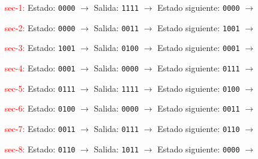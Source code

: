 \documentclass[12pt, letterpaper]{article}
\begin{document}
\begin{enumerate}
    \item[\textcolor{red}{sec-1:}] Estado: \texttt{0000} \(\rightarrow\) Salida: \texttt{1111} \(\rightarrow\) Estado siguiente: \texttt{0000} \(\rightarrow\)
    \item[\textcolor{red}{sec-2:}] Estado: \texttt{0000} \(\rightarrow\) Salida: \texttt{0011} \(\rightarrow\) Estado siguiente: \texttt{1001} \(\rightarrow\)
    \item[\textcolor{red}{sec-3:}] Estado: \texttt{1001} \(\rightarrow\) Salida: \texttt{0100} \(\rightarrow\) Estado siguiente: \texttt{0001} \(\rightarrow\)
    \item[\textcolor{red}{sec-4:}] Estado: \texttt{0001} \(\rightarrow\) Salida: \texttt{0000} \(\rightarrow\) Estado siguiente: \texttt{0111} \(\rightarrow\)
    \item[\textcolor{red}{sec-5:}] Estado: \texttt{0111} \(\rightarrow\) Salida: \texttt{1111} \(\rightarrow\) Estado siguiente: \texttt{0100} \(\rightarrow\)
    \item[\textcolor{red}{sec-6:}] Estado: \texttt{0100} \(\rightarrow\) Salida: \texttt{0000} \(\rightarrow\) Estado siguiente: \texttt{0011} \(\rightarrow\)
    \item[\textcolor{red}{sec-7:}] Estado: \texttt{0011} \(\rightarrow\) Salida: \texttt{0111} \(\rightarrow\) Estado siguiente: \texttt{0110} \(\rightarrow\)
    \item[\textcolor{red}{sec-8:}] Estado: \texttt{0110} \(\rightarrow\) Salida: \texttt{1011} \(\rightarrow\) Estado siguiente: \texttt{0000} \(\rightarrow\)
\end{enumerate}
\end{document}
